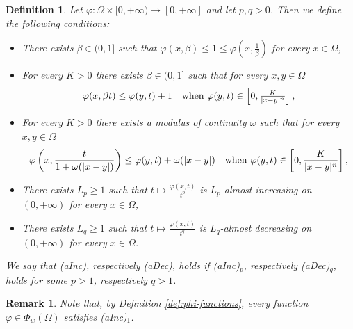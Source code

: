 \documentclass[a4paper,11pt,oneside,notitlepage]{article}
\newtheorem{definition}[theorem]{Definition}
\newtheorem{remark}[theorem]{Remark}
\numberwithin{equation}{section}
\newcommand{\vphi}{\varphi}
\begin{document}
\begin{definition}
\label{prop_Orlicz}
    Let $\vphi : \Omega \times [0,+\infty) \to [0,+\infty]$ and let $p,q > 0$. Then we define the following conditions:
    \begin{itemize}
        \item[(A0)] There exists $\beta \in (0,1]$ such that $\vphi(x,\beta) \le 1 \le \vphi(x, \tfrac{1}{\beta})$ for every $x \in \Omega$,
        
        \item[(A1)] For every $K > 0$ there exists $\beta \in (0,1]$ such that for every $x,y \in \Omega$
        \begin{equation*}
            \vphi(x,\beta t) \le \vphi(y,t) + 1 \quad \textnormal{when } \vphi(y, t) \in \left[0, \tfrac{K}{|x-y|^n}\right],
        \end{equation*}
        
        \item[(VA1)] For every $K > 0$ there exists a modulus of continuity $\omega$ such that for every $x,y \in \Omega$
        \begin{equation*}
            \vphi \left(x,\frac{t}{1 + \omega(|x-y|)}\right) \le \vphi(y,t) + \omega(|x-y|) \quad \textnormal{when } \vphi(y, t) \in \left[0, \frac{K}{|x-y|^n}\right],
        \end{equation*}
        
        \item[(aInc)$_p$] There exists $L_p \ge 1$ such that $t \mapsto \tfrac{\vphi(x,t)}{t^p}$ is $L_p$-almost increasing on $(0,+\infty)$ for every $x \in \Omega$,
        
        \item[(aDec)$_q$] There exists $L_q \ge 1$ such that $t \mapsto \tfrac{\vphi(x,t)}{t^q}$ is $L_q$-almost decreasing on $(0,+\infty)$ for every $x \in \Omega$.
    \end{itemize}
    We say that (aInc), respectively (aDec), holds if (aInc)$_p$, respectively (aDec)$_q$, holds for some $p > 1$, respectively $q > 1$.
\end{definition}

\begin{remark}
\label{rmk:prop_ainc}
    Note that, by Definition \ref{def:phi-functions}, every function $\vphi \in \Phi_w(\Omega)$ satisfies (aInc)$_1$.
\end{remark}
\end{document}
